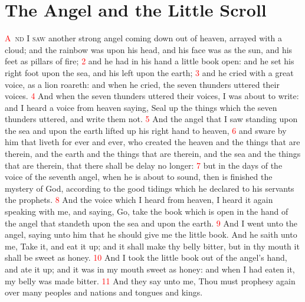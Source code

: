 \documentclass[12pt,twoside]{memoir}
\newcommand{\vnum}[1]{\textcolor{red}{\normalsize{#1}}}
\begin{document}
\chapter{The Angel and the Little Scroll}
\lettrine[lines=3,slope=-0.5em]{\textcolor{red}{A}}{\ nd I saw} another strong angel coming down out of heaven, arrayed with a cloud; and the rainbow was upon his head, and his face was as the sun, and his feet as pillars of fire; 
\vnum{2} and he had in his hand a little book open: and he set his right foot upon the sea, and his left upon the earth; 
\vnum{3} and he cried with a great voice, as a lion roareth: and when he cried, the seven thunders uttered their voices. 
\vnum{4} And when the seven thunders uttered their voices, I was about to write: and I heard a voice from heaven saying, Seal up the things which the seven thunders uttered, and write them not. 
\vnum{5} And the angel that I saw standing upon the sea and upon the earth lifted up his right hand to heaven, 
\vnum{6} and sware by him that liveth for ever and ever, who created the heaven and the things that are therein, and the earth and the things that are therein, and the sea and the things that are therein, that there shall be delay no longer: 
\vnum{7} but in the days of the voice of the seventh angel, when he is about to sound, then is finished the mystery of God, according to the good tidings which he declared to his servants the prophets. 
\vnum{8} And the voice which I heard from heaven, I heard it again speaking with me, and saying, Go, take the book which is open in the hand of the angel that standeth upon the sea and upon the earth. 
\vnum{9} And I went unto the angel, saying unto him that he should give me the little book. And he saith unto me, Take it, and eat it up; and it shall make thy belly bitter, but in thy mouth it shall be sweet as honey. 
\vnum{10} And I took the little book out of the angel’s hand, and ate it up; and it was in my mouth sweet as honey: and when I had eaten it, my belly was made bitter. 
\vnum{11} And they say unto me, Thou must prophesy again over many peoples and nations and tongues and kings.

\end{document}
